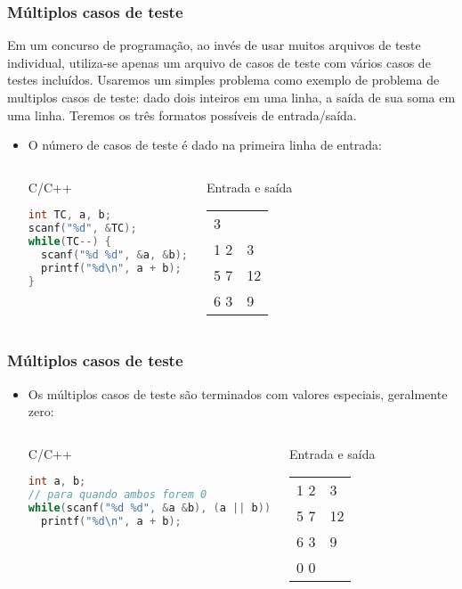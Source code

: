 \begin{frame} [fragile]
  \frametitle{Múltiplos casos de teste}
  {\small Em um concurso de programação, ao invés de usar muitos arquivos de teste individual, utiliza-se apenas um arquivo de casos de teste com vários casos de testes incluídos. Usaremos um simples problema como exemplo de problema de multiplos casos de teste: dado dois inteiros em uma linha, a saída de sua soma em uma linha. Teremos os três formatos possíveis de entrada/saída.}
    \begin{itemize}
      \item {\small O número de casos de teste é dado na primeira linha de entrada:}
      \begin{columns}
      \begin{block:ie}{C/C++}
	\begin{lstlisting}[language=c]
int TC, a, b;
scanf("%d", &TC);
while(TC--) {
  scanf("%d %d", &a, &b);
  printf("%d\n", a + b);
}
	\end{lstlisting}
      \end{block:ie}

      \begin{block:ie}{Entrada e saída}
	\begin{tabularx}{\textwidth}{|X|X|}
	  3\\1 2&3\\5 7&12\\6 3 &9
	\end{tabularx}
      \end{block:ie}
    \end{columns}
  \end{itemize}
\end{frame}

\begin{frame} [fragile]
  \frametitle{Múltiplos casos de teste}
    \begin{itemize}
      \item {\small Os múltiplos casos de teste são terminados com valores especiais, geralmente zero:}
      \begin{columns}
      \begin{block:ie}{C/C++}
	\begin{lstlisting}[language=c]
int a, b;
// para quando ambos forem 0
while(scanf("%d %d", &a &b), (a || b))
  printf("%d\n", a + b);
	\end{lstlisting}
      \end{block:ie}

      \begin{block:ie}{Entrada e saída}
	\begin{tabularx}{\textwidth}{|X|X|}
	  1 2&3\\5 7&12\\6 3&9\\0 0
	\end{tabularx}
      \end{block:ie}
    \end{columns}
  \end{itemize}
\end{frame}

